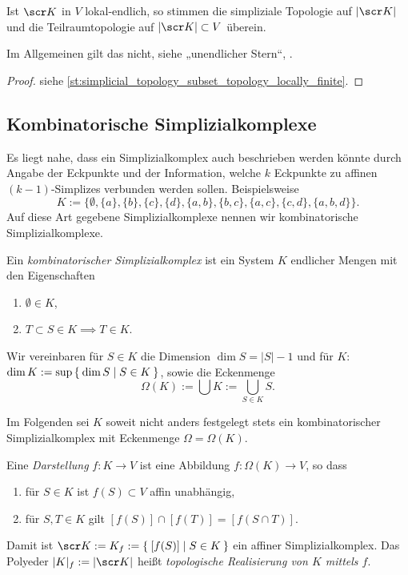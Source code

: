 \begin{nt}
	Ist $\scr K$ in $V$ lokal-endlich, so stimmen die simpliziale Topologie auf $|\scr K|$ und die Teilraumtopologie auf $|\scr K| \subset V$ überein.

	Im Allgemeinen gilt das nicht, siehe „unendlicher Stern“, .
	\begin{proof}
		siehe \ref{st:simplicial_topology_subset_topology_locally_finite}.
	\end{proof}
\end{nt}


\subsection{Kombinatorische Simplizialkomplexe}

Es liegt nahe, dass ein Simplizialkomplex auch beschrieben werden könnte durch Angabe der Eckpunkte und der Information, welche $k$ Eckpunkte zu affinen $(k-1)$-Simplizes verbunden werden sollen.
Beispielsweise
\[
	K := \Big\{ \emptyset, \{a\}, \{b\}, \{c\}, \{d\}, \{a,b\}, \{b,c\}, \{a,c\}, \{c,d\}, \{a,b,d\} \Big\}.
\]
Auf diese Art gegebene Simplizialkomplexe nennen wir kombinatorische Simplizialkomplexe.

\begin{df}
	Ein \emph{kombinatorischer Simplizialkomplex} ist ein System $K$ endlicher Mengen mit den Eigenschaften
	\begin{enumerate}[1),start=0]
		\item
			$\emptyset \in K$,
		\item
			$T \subset S \in K \implies T \in K$.
	\end{enumerate}
	Wir vereinbaren für $S \in K$ die Dimension $\dim S = |S| - 1$ und für $K$: $\dim K := \sup \Set{ \dim S | S \in K }$, sowie die Eckenmenge
	\[
		\Omega(K) := \bigcup K := \bigcup_{S \in K} S.
	\]
\end{df}

\begin{conv}
	Im Folgenden sei $K$ soweit nicht anders festgelegt stets ein kombinatorischer Simplizialkomplex mit Eckenmenge $\Omega = \Omega(K)$.
\end{conv}

\begin{df}
	Eine \emph{Darstellung} $f: K \to V$ ist eine Abbildung $f: \Omega(K) \to V$, so dass
	\begin{enumerate}[1)]
		\item
			für $S \in K$ ist $f(S) \subset V$ affin unabhängig,
		\item
			für $S, T \in K$ gilt $[f(S)] \cap [f(T)] = [f(S \cap T)]$.
	\end{enumerate}
	Damit ist $\scr K := K_f := \Set{ [f(S)] | S \in K }$ ein affiner Simplizialkomplex.
	Das Polyeder $|K|_f := |\scr K|$ heißt \emph{topologische Realisierung von $K$ mittels $f$}.
\end{df}

